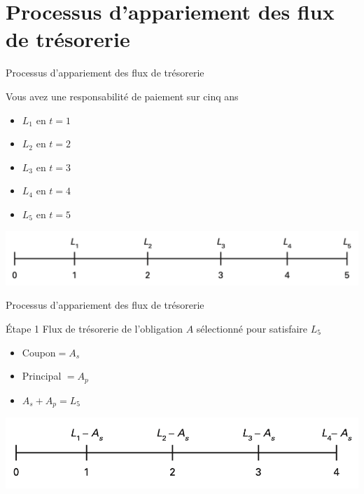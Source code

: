\documentclass{beamer}
\begin{document}
\section{Processus d'appariement des flux de trésorerie}

\begin{frame}{Processus d'appariement des flux de trésorerie}
\begin{block}{Vous avez une responsabilité de paiement sur cinq ans}
\begin{itemize}[label=\bullet]
\item $L_1$ en $t=1$
\item $L_2$ en $t=2$
\item $L_3$ en $t=3$
\item $L_4$ en $t=4$ 
\item $L_5$ en $t=5$
\end{itemize}
\end{block}
\includegraphics[scale=.5]{1}
\end{frame}

\begin{frame}{Processus d'appariement des flux de trésorerie}
\begin{block}{Étape 1}
Flux de trésorerie de l'obligation $A$ sélectionné pour satisfaire $L_5$
\begin{itemize}[label=\bullet]
\item Coupon$=A_s$ 
\item Principal $=A_p$
\item $A_s+A_p=L_5$
\end{itemize}
\end{block}
\includegraphics[scale=.5]{2}
\end{frame}
\end{document}
